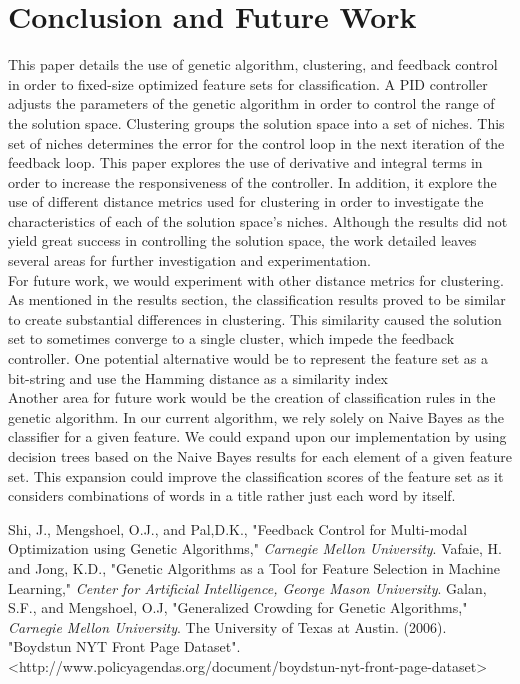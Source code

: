 \documentclass{sig-alternate}
\begin{document}
\section{Conclusion and Future Work}
This paper details the use of genetic algorithm, clustering, and feedback control in order to fixed-size optimized feature sets for classification. A PID controller adjusts the parameters of the genetic algorithm in order to control the range of the solution space. Clustering groups the solution space into a set of niches. This set of niches determines the error for the control loop in the next iteration of the feedback loop. This paper explores the use of derivative and integral terms in order to increase the responsiveness of the controller. In addition, it explore the use of different distance metrics used for clustering in order to investigate the characteristics of each of the solution space's niches. Although the results did not yield great success in controlling the solution space, the work detailed leaves several areas for further investigation and experimentation.\\
\indent For future work, we would experiment with other distance metrics for clustering. As mentioned in the results section, the classification results proved to be similar to create substantial differences in clustering. This similarity caused the solution set to sometimes converge to a single cluster, which impede the feedback controller. One potential alternative would be to represent the feature set as a bit-string and use the Hamming distance as a similarity index\cite{features}\\
\indent Another area for future work would be the creation of classification rules in the genetic algorithm. In our current algorithm, we rely solely on Naive Bayes as the classifier for a given feature. We could expand upon our implementation by using decision trees based on the Naive Bayes results for each element of a given feature set. This expansion could improve the classification scores of the feature set as it considers combinations of words in a title rather just each word by itself.

\begin{thebibliography}{100}
	
	 Shi, J., Mengshoel, O.J., and Pal,D.K., "Feedback Control for Multi-modal Optimization using Genetic Algorithms," \emph{Carnegie Mellon University}.
	 Vafaie, H. and Jong, K.D., "Genetic Algorithms as a Tool for Feature Selection in Machine Learning," \emph{Center for Artificial Intelligence, George Mason University}.
	 Galan, S.F., and Mengshoel, O.J, "Generalized Crowding for Genetic Algorithms," \emph{Carnegie Mellon University}.
	The University of Texas at Austin. (2006). "Boydstun NYT Front Page Dataset". <http://www.policyagendas.org/document/boydstun-nyt-front-page-dataset>
	
\end{thebibliography}
\end{document}
